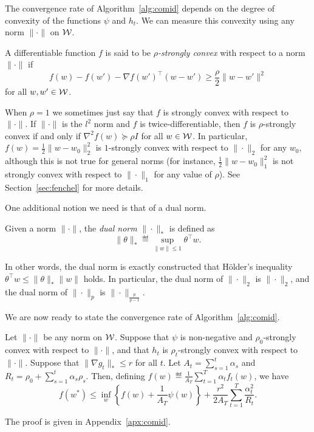 \documentclass[paper.tex]{subfiles}
\begin{document}
The convergence rate of Algorithm~\ref{alg:comid} depends on the degree of 
convexity of the functions $\psi$ and $h_t$. We can measure this convexity 
using any norm $\|\cdot\|$ on $\mathcal{W}$.
\begin{definition}
A differentiable function $f$ is said to be \emph{$\rho$-strongly convex} with 
respect to a norm $\|\cdot\|$ if
\[ f(w) - f(w') - \nabla f(w')^{\top}(w - w') \geq \frac{\rho}{2}\|w-w'\|^2 \]
for all $w, w' \in \mathcal{W}$.
\end{definition}
When $\rho = 1$ we sometimes just say that $f$ is strongly convex with respect to $\|\cdot\|$.
If $\|\cdot\|$ is the $l^2$ norm and $f$ is twice-differentiable, then $f$ is $\rho$-strongly 
convex if and only if $\nabla^2 f(w) \succeq \rho I$ for all $w \in \mathcal{W}$. In particular, 
$f(w) = \frac{1}{2}\|w - w_0\|_2^2$ is $1$-strongly convex with respect to $\|\cdot\|_2$ for 
any $w_0$, although this is not true for general norms (for instance, 
$\frac{1}{2}\|w-w_0\|_1^2$ is not strongly convex with respect to $\|\cdot\|_1$ for any value 
of $\rho$). See Section~\ref{sec:fenchel} for more details.

One additional notion we need is that of a dual norm.
\begin{definition}
Given a norm $\|\cdot\|$, the \emph{dual norm} $\|\cdot\|_*$ is defined as 
\[ \|\theta\|_* \eqdef \sup_{\|w\| \leq 1} \theta^{\top}w. \]
\end{definition}
In other words, the dual norm is exactly constructed that H\"{o}lder's 
inequality $\theta^{\top}w \leq \|\theta\|_* \|w\|$ holds. In particular, 
the dual norm of $\|\cdot\|_2$ is $\|\cdot\|_2$, and the dual norm of 
$\|\cdot\|_p$ is $\|\cdot\|_{\frac{p}{p-1}}$.

We are now ready to state the convergence rate of Algorithm~\ref{alg:comid}.
\begin{theorem}
\label{thm:comid}
Let $\|\cdot\|$ be any norm on $\mathcal{W}$. Suppose that $\psi$ is non-negative and $\rho_0$-strongly convex 
with respect to $\|\cdot\|$, and that $h_t$ is $\rho_t$-strongly convex with respect 
to $\|\cdot\|$. Suppose that $\|\nabla g_t\|_* \leq r$ for all $t$. Let 
$A_t = \sum_{s=1}^t \alpha_s$ and $R_t = \rho_0 + \sum_{s=1}^t \alpha_s \rho_s$. 
Then, defining $f(w) \eqdef \frac{1}{A_T} \sum_{t=1}^{T} \alpha_t f_t(w)$, we have
\[ f(w^*) \leq \inf_{w} \left\{ f(w) + \frac{1}{A_T} \psi(w)\right\} + \frac{r^2}{2A_T} \sum_{t=1}^T \frac{\alpha_t^2}{R_t}. \]
\end{theorem}
The proof is given in Appendix~\ref{apx:comid}.
\end{document}
